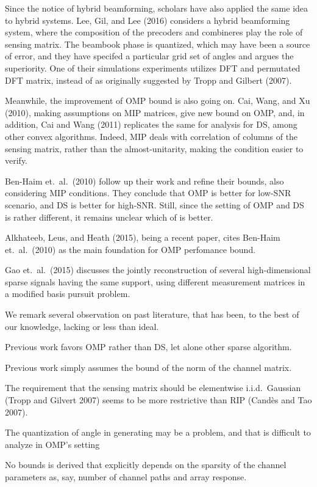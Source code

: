 Since the notice of hybrid beamforming, scholars have also applied the same idea to hybrid systems.
Lee, Gil, and Lee (2016) considers a hybrid beamforming system, where the composition of the precoders and combineres play the role of sensing matrix.
The beambook phase is quantized, which may have been a source of error, and they have specifed a particular grid set of angles and argues the superiority.
One of their simulations experiments utilizes DFT and permutated DFT matrix, instead of as originally suggested by Tropp and Gilbert (2007).

Meanwhile, the improvement of OMP bound is also going on.
Cai, Wang, and Xu (2010), making assumptions on MIP matrices, give new bound on OMP, and, in addition, Cai and Wang (2011) replicates the same for analysis for DS, among other convex algorithms.
Indeed, MIP deals with correlation of columns of the sensing matrix, rather than the almost-unitarity, making the condition easier to verify.

Ben-Haim et.\ al.\ (2010) follow up their work and refine their bounds, also considering MIP conditions.
They conclude that OMP is better for low-SNR scenario, and DS is better for high-SNR.
Still, since the setting of OMP and DS is rather different, it remains unclear which of is better.

Alkhateeb, Leus, and Heath (2015), being a recent paper, cites Ben-Haim et.\ al.\ (2010) as the main foundation for OMP perfomance bound.

Gao et.\ al.\ (2015) discusses the jointly reconstruction of several high-dimensional sparse signals having the same support, using different measurement matrices in a modified basis pursuit problem.

We remark several observation on past literature, that has been, to the best of our knowledge, lacking or less than ideal.

\startitemize
\item Previous work favors OMP rather than DS, let alone other sparse algorithm.
\item Previous work simply assumes the bound of the norm of the channel matrix.
\item The requirement that the sensing matrix should be elementwise i.i.d.\ Gaussian (Tropp and Gilvert 2007) seems to be more restrictive than RIP (Cand\`es and Tao 2007).
\item The quantization of angle in generating may be a problem, and that is difficult to analyze in OMP's setting
\item No bounds is derived that explicitly depends on the sparsity of the channel parameters as, say, number of channel paths and array response.
\stopitemize

